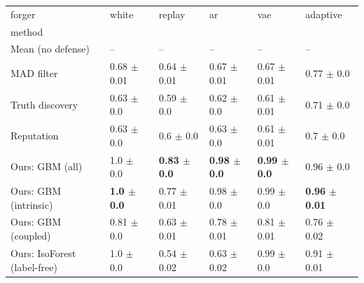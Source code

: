 \begin{tabular}{llllll}
\toprule
forger & white & replay & ar & vae & adaptive \\
method &  &  &  &  &  \\
\midrule
Mean (no defense) & -- & -- & -- & -- & -- \\
MAD filter & 0.68 $\pm$ 0.01 & 0.64 $\pm$ 0.01 & 0.67 $\pm$ 0.01 & 0.67 $\pm$ 0.01 & 0.77 $\pm$ 0.0 \\
Truth discovery & 0.63 $\pm$ 0.0 & 0.59 $\pm$ 0.0 & 0.62 $\pm$ 0.0 & 0.61 $\pm$ 0.01 & 0.71 $\pm$ 0.0 \\
Reputation & 0.63 $\pm$ 0.0 & 0.6 $\pm$ 0.0 & 0.63 $\pm$ 0.0 & 0.61 $\pm$ 0.01 & 0.7 $\pm$ 0.0 \\
Ours: GBM (all) & 1.0 $\pm$ 0.0 & \textbf{0.83 $\pm$ 0.0} & \textbf{0.98 $\pm$ 0.0} & \textbf{0.99 $\pm$ 0.0} & 0.96 $\pm$ 0.0 \\
Ours: GBM (intrinsic) & \textbf{1.0 $\pm$ 0.0} & 0.77 $\pm$ 0.01 & 0.98 $\pm$ 0.0 & 0.99 $\pm$ 0.0 & \textbf{0.96 $\pm$ 0.01} \\
Ours: GBM (coupled) & 0.81 $\pm$ 0.0 & 0.63 $\pm$ 0.01 & 0.78 $\pm$ 0.01 & 0.81 $\pm$ 0.01 & 0.76 $\pm$ 0.02 \\
Ours: IsoForest (label-free) & 1.0 $\pm$ 0.0 & 0.54 $\pm$ 0.02 & 0.63 $\pm$ 0.02 & 0.99 $\pm$ 0.0 & 0.91 $\pm$ 0.01 \\
\bottomrule
\end{tabular}
